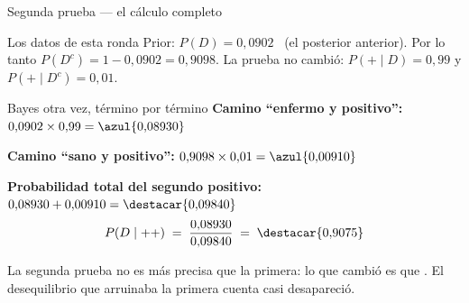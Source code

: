\documentclass[aspectratio=169,10pt]{beamer}
\begin{document}
\begin{frame}{Segunda prueba — el cálculo completo}
  \scriptsize
  \begin{block}{Los datos de esta ronda}
    \tiny
    Prior: $P(D) = 0{,}0902$ \ (el posterior anterior). \quad
    Por lo tanto $P(D^{c}) = 1-0{,}0902 = 0{,}9098$. \quad
    La prueba no cambió: $P(+\mid D)=0{,}99$ y $P(+\mid D^{c})=0{,}01$.
  \end{block}

  \vspace{0.06cm}
  \begin{exampleblock}{Bayes otra vez, término por término}
    \tiny
    \textbf{Camino ``enfermo y positivo'':} \quad
    $0{,}0902\times 0{,}99 = \azul{0{,}08930}$

    \vspace{0.04cm}
    \textbf{Camino ``sano y positivo'':} \quad
    $0{,}9098\times 0{,}01 = \azul{0{,}00910}$

    \vspace{0.04cm}
    \textbf{Probabilidad total del segundo positivo:} \quad
    $0{,}08930+0{,}00910 = \destacar{0{,}09840}$
    \[ P(D\mid ++) \;=\; \frac{0{,}08930}{0{,}09840}
       \;=\; \destacar{0{,}9075} \]
  \end{exampleblock}

  \vspace{0.06cm}
  {\tiny\color{uniGris}  La segunda prueba no es más precisa que la primera: lo que cambió
  es que . El
  desequilibrio que arruinaba la primera cuenta casi desapareció.}
\end{frame}
\end{document}
